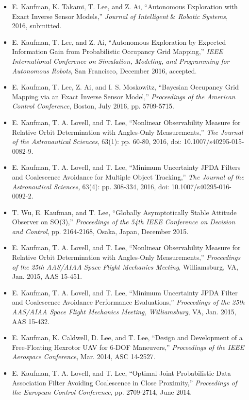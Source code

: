 \begin{itemize}
	\item E. Kaufman, K. Takami, T. Lee, and Z. Ai, ``Autonomous Exploration with Exact Inverse Sensor Models,'' \textit{Journal of Intelligent }\&\textit{ Robotic Systems}, 2016, submitted.
	\item E. Kaufman, T. Lee, and Z. Ai, ``Autonomous Exploration by Expected Information Gain from Probabilistic Occupancy Grid Mapping,'' \textit{IEEE International Conference on Simulation, Modeling, and Programming for Autonomous Robots}, San Francisco, December 2016, accepted.
	\item E. Kaufman, T. Lee, Z. Ai, and I. S. Moskowitz, ``Bayesian Occupancy Grid Mapping via an Exact Inverse Sensor Model,'' \textit{Proceedings of the American Control Conference}, Boston, July 2016, pp. 5709-5715.
	\item E. Kaufman, T. A. Lovell, and T. Lee, ``Nonlinear Observability Measure for Relative Orbit Determination with Angles-Only Measurements,'' \textit{The Journal of the Astronautical Sciences}, 63(1): pp. 60-80, 2016, doi: 10.1007/s40295-015-0082-9.
	\item E. Kaufman, T. A. Lovell, and T. Lee, ``Minimum Uncertainty JPDA Filters and Coalescence Avoidance for Multiple Object Tracking,'' \textit{The Journal of the Astronautical Sciences}, 63(4): pp. 308-334, 2016, doi: 10.1007/s40295-016-0092-2.
	\item T. Wu, E. Kaufman, and T. Lee, ``Globally Asymptotically Stable Attitude Observer on SO(3),'' \textit{Proceedings of the 54th IEEE Conference on Decision and Control}, pp. 2164-2168, Osaka, Japan, December 2015.
	\item E. Kaufman, T. A. Lovell, and T. Lee, ``Nonlinear Observability Measure for Relative Orbit Determination with Angles-Only Measurements,'' \textit{Proceedings of the 25th AAS/AIAA Space Flight Mechanics Meeting}, Williamsburg, VA, Jan. 2015, AAS 15-451.
	\item E. Kaufman, T. A. Lovell, and T. Lee, ``Minimum Uncertainty JPDA Filter and Coalescence Avoidance Performance Evaluations,'' \textit{Proceedings of the 25th AAS/AIAA Space Flight Mechanics Meeting, Williamsburg}, VA, Jan. 2015, AAS 15-432.
	\item E. Kaufman, K. Caldwell, D. Lee, and T. Lee, ``Design and Development of a Free-Floating Hexrotor UAV for 6-DOF Maneuvers,'' \textit{Proceedings of the IEEE Aerospace Conference}, Mar. 2014, ASC 14-2527.
	\item E. Kaufman, T. A. Lovell, and T. Lee, ``Optimal Joint Probabilistic Data Association Filter Avoiding Coalescence in Close Proximity,'' \textit{Proceedings of the European Control Conference}, pp. 2709-2714, June 2014.
	\vspace*{0.5cm}
\end{itemize}







